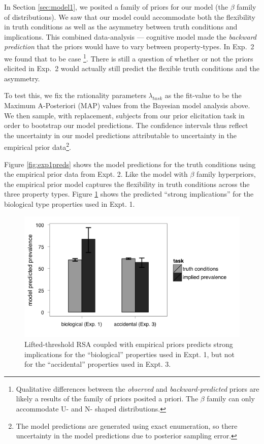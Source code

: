 \documentclass[10pt,letterpaper]{article}
\begin{document}
In Section \ref{sec:model1}, we posited a family of priors for our model (the $\beta$ family of distributions). We saw that our model could accommodate both the flexibility in truth conditions as well as the asymmetry between truth conditions and implications. This combined data-analysis --- cognitive model made the \emph{backward prediction} that the priors would have to vary between property-types. In Exp.~2 we found that to be case \footnote{Qualitative differences between the \emph{observed} and \emph{backward-predicted} priors are likely a results of the family of priors posited a priori. The $\beta$ family can only accommodate U- and N- shaped distributions.}. There is still a question of whether or not the priors elicited in Exp.~2 would actually still predict the flexible truth conditions and the asymmetry.  

To test this, we fix the rationality parameters $\lambda_{task}$ as the fit-value to be the Maximum A-Posteriori (MAP) values from the Bayesian model analysis above. We then sample, with replacement, subjects from our prior elicitation task in order to bootstrap our model predictions. The confidence intervals thus reflect the uncertainty in our model predictions attributable to uncertainty in the empirical prior data\footnote{The model predictions are generated using exact enumeration, so there uncertainty in the model predictions due to posterior sampling error.}. 



Figure \ref{fig:exp1preds} shows the model predictions for the truth conditions using the empirical prior data from Expt. 2. Like the model with $\beta$ family hyperpriors, the empirical prior model captures the flexibility in truth conditions across the three property types. Figure \ref{fig:model_asyms} shows the predicted ``strong implications'' for the biological type properties used in Expt. 1.


\begin{figure}
\centering
    \includegraphics[width=0.8\columnwidth]{model_asymmetries}
    \caption{Lifted-threshold RSA coupled with empirical priors predicts strong implications for the ``biological'' properties used in Expt. 1, but not for the ``accidental'' properties used in Expt. 3.}
  \label{fig:model_asyms}
\end{figure}
\end{document}
